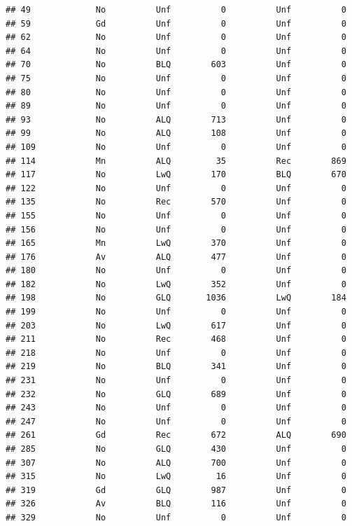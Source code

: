 \documentclass[]{article}
\begin{document}
\begin{verbatim}
## 49             No          Unf          0          Unf          0
## 59             Gd          Unf          0          Unf          0
## 62             No          Unf          0          Unf          0
## 64             No          Unf          0          Unf          0
## 70             No          BLQ        603          Unf          0
## 75             No          Unf          0          Unf          0
## 80             No          Unf          0          Unf          0
## 89             No          Unf          0          Unf          0
## 93             No          ALQ        713          Unf          0
## 99             No          ALQ        108          Unf          0
## 109            No          Unf          0          Unf          0
## 114            Mn          ALQ         35          Rec        869
## 117            No          LwQ        170          BLQ        670
## 122            No          Unf          0          Unf          0
## 135            No          Rec        570          Unf          0
## 155            No          Unf          0          Unf          0
## 156            No          Unf          0          Unf          0
## 165            Mn          LwQ        370          Unf          0
## 176            Av          ALQ        477          Unf          0
## 180            No          Unf          0          Unf          0
## 182            No          LwQ        352          Unf          0
## 198            No          GLQ       1036          LwQ        184
## 199            No          Unf          0          Unf          0
## 203            No          LwQ        617          Unf          0
## 211            No          Rec        468          Unf          0
## 218            No          Unf          0          Unf          0
## 219            No          BLQ        341          Unf          0
## 231            No          Unf          0          Unf          0
## 232            No          GLQ        689          Unf          0
## 243            No          Unf          0          Unf          0
## 247            No          Unf          0          Unf          0
## 261            Gd          Rec        672          ALQ        690
## 285            No          GLQ        430          Unf          0
## 307            No          ALQ        700          Unf          0
## 315            No          LwQ         16          Unf          0
## 319            Gd          GLQ        987          Unf          0
## 326            Av          BLQ        116          Unf          0
## 329            No          Unf          0          Unf          0

\end{verbatim}
\end{document}
